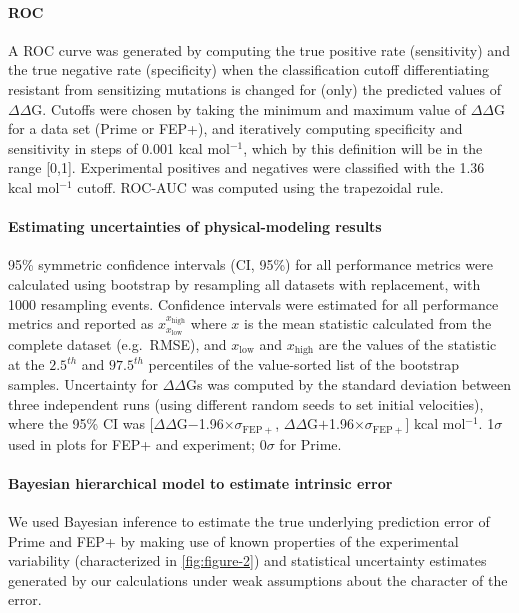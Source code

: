 \documentclass[phd,tocprelim]{cornell}
\renewcommand{\FIG}[1]{\autoref{fig:#1}}
\begin{document}
\paragraph{ROC}
A ROC curve was generated by computing the true positive rate (sensitivity) and the true negative rate (specificity) when the classification cutoff differentiating resistant from sensitizing mutations is changed for (only) the predicted values of $\Delta\Delta$G. Cutoffs were chosen by taking the minimum and maximum value of $\Delta\Delta$G for a data set (Prime or FEP+), and iteratively computing specificity and sensitivity in steps of 0.001 kcal mol$^{-1}$, which by this definition will be in the range [0,1]. Experimental positives and negatives were classified with the 1.36 kcal mol$^{-1}$ cutoff. ROC-AUC was computed using the trapezoidal rule.

\paragraph{Estimating uncertainties of physical-modeling results}
95\% symmetric confidence intervals (CI, 95\%) for all performance metrics were calculated using bootstrap by resampling all datasets with replacement, with 1000 resampling events.
Confidence intervals were estimated for all performance metrics and reported as $x_{x_\mathrm{low}}^{x_\mathrm{high}}$ where $x$ is the mean statistic calculated from the complete dataset (e.g.~RMSE), and $x_\mathrm{low}$ and $x_\mathrm{high}$ are the values of the statistic at the $2.5^{th}$ and $97.5^{th}$ percentiles of the value-sorted list of the bootstrap samples.
Uncertainty for $\Delta\Delta$Gs was computed by the standard deviation between three independent runs (using different random seeds to set initial velocities), where the 95\% CI was [$\Delta\Delta$G$-$1.96$\times \sigma _\mathrm{FEP+}$, $\Delta\Delta$G$+$1.96$\times \sigma _\mathrm{FEP+}$] kcal mol$^{-1}$.
1$\sigma$ used in plots for FEP+ and experiment; 0$\sigma$ for Prime.

\paragraph{Bayesian hierarchical model to estimate intrinsic error}
We used Bayesian inference to estimate the true underlying prediction error of Prime and FEP+ by making use of known properties of the experimental variability (characterized in \FIG{figure-2}) and statistical uncertainty estimates generated by our calculations under weak assumptions about the character of the error.
\end{document}
